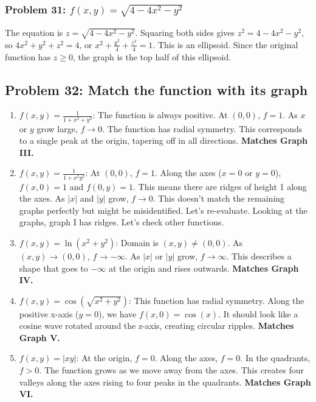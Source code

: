 \documentclass{article}
\begin{document}
\subsubsection{Problem 31: $f(x, y) = \sqrt{4 - 4x^2 - y^2}$}
The equation is $z = \sqrt{4 - 4x^2 - y^2}$. Squaring both sides gives $z^2 = 4 - 4x^2 - y^2$, so $4x^2 + y^2 + z^2 = 4$, or $x^2 + \frac{y^2}{4} + \frac{z^2}{4} = 1$. This is an ellipsoid. Since the original function has $z \ge 0$, the graph is the top half of this ellipsoid.

\subsection{Problem 32: Match the function with its graph}
\begin{enumerate}[label=\alph*.]
    \item $f(x, y) = \frac{1}{1 + x^2 + y^2}$: The function is always positive. At $(0,0)$, $f=1$. As $x$ or $y$ grow large, $f \to 0$. The function has radial symmetry. This corresponds to a single peak at the origin, tapering off in all directions. \textbf{Matches Graph III.}
    
    \item $f(x, y) = \frac{1}{1 + x^2y^2}$: At $(0,0)$, $f=1$. Along the axes ($x=0$ or $y=0$), $f(x,0)=1$ and $f(0,y)=1$. This means there are ridges of height 1 along the axes. As $|x|$ and $|y|$ grow, $f \to 0$. This doesn't match the remaining graphs perfectly but might be misidentified. Let's re-evaluate.
    Looking at the graphs, graph I has ridges. Let's check other functions.
    
    \item $f(x, y) = \ln(x^2 + y^2)$: Domain is $(x,y) \neq (0,0)$. As $(x,y) \to (0,0)$, $f \to -\infty$. As $|x|$ or $|y|$ grow, $f \to \infty$. This describes a shape that goes to $-\infty$ at the origin and rises outwards. \textbf{Matches Graph IV.}
    
    \item $f(x, y) = \cos(\sqrt{x^2+y^2})$: This function has radial symmetry. Along the positive x-axis ($y=0$), we have $f(x,0)=\cos(x)$. It should look like a cosine wave rotated around the z-axis, creating circular ripples. \textbf{Matches Graph V.}
    
    \item $f(x, y) = |xy|$: At the origin, $f=0$. Along the axes, $f=0$. In the quadrants, $f>0$. The function grows as we move away from the axes. This creates four valleys along the axes rising to four peaks in the quadrants. \textbf{Matches Graph VI.}
    

\end{enumerate}
\end{document}
